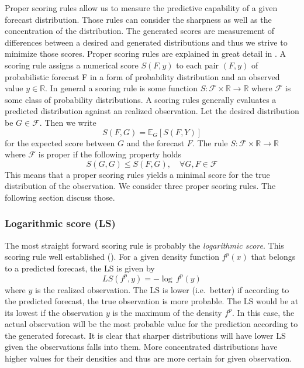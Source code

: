 \documentclass[12pt,a4paper,twoside]{scrartcl}
\numberwithin{equation}{section}
\begin{document}
Proper scoring rules allow us to measure the  predictive capability of a given forecast distribution. Those rules can consider the sharpness as well as the concentration of the distribution. The generated  scores are measurement of differences between a desired and generated distributions and thus we strive to minimize those scores. Proper scoring rules are explained in great detail in \cite{gneiting2007}.
A scoring rule assigns a numerical score \(S(F, y)\) to each pair \((F, y)\) of probabilistic forecast F in a form of probability distribution and an observed value \(y \in \mathbb{R}\). In general a scoring rule is some function \(S:\mathcal{F} \times \mathbb{R} \rightarrow \mathbb{R}\) where \(\mathcal{F}\) is some class of probability distributions. A scoring rules generally evaluates a predicted distribution against an realized observation. Let the desired distribution be \(G\in\mathcal{F}\). Then we write
\begin{equation}
  S(F,G) =\mathbb{E}_G[S(F,Y)]
\end{equation}
for the expected score between \(G\) and the forecast \(F\). 
The rule  \(S: \mathcal{F} \times \mathbb{R} \rightarrow \mathbb{R}\) where \(\mathcal{F}\) is proper if the following property holds
\begin{equation}
  S(G,G) \leq S(F,G),\quad \forall G,F \in \mathcal{F}
\end{equation}
This means that a proper scoring rules yields a minimal score for the true distribution of the observation.
We consider three proper scoring rules. The following section discuss those.
\subsubsection{Logarithmic score (LS)}
\label{sec:ls}

The most straight forward scoring rule is probably the \emph{logarithmic score}. This scoring rule well established (\cite{good1952}). For a given density function \(f^p(x)\) that belongs to a predicted forecast, the LS is given by
\begin{equation}
  LS(f^p,y) = -\log \, f^p(y)
\end{equation}
where \(y\) is the realized observation. The LS is lower (i.e.\ better) if according to the predicted forecast, the true observation is more probable. The LS would be at its lowest if the observation \(y\) is the maximum of the density \(f^p\). In this case, the actual observation will be the most probable value for the prediction according to the generated forecast. It is clear that sharper distributions will have lower LS given the observations falls into them. More concentrated distributions have higher values for their densities and thus are more certain for given observation.
\end{document}
